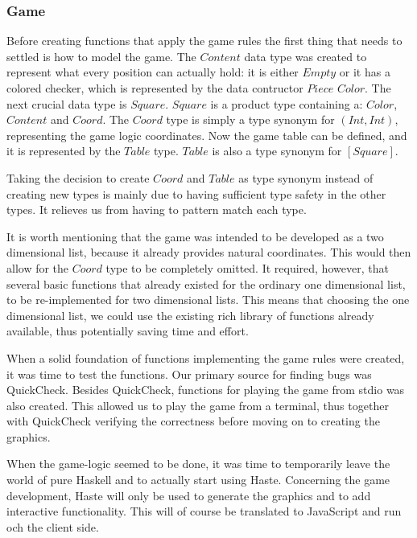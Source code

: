 \documentclass[a4paper]{article}
\begin{document}
\subsubsection{Game}
Before creating functions that apply the game rules the first thing that needs to settled is how to model the game. The $Content$ data type was created to represent what every position can actually hold: it is either $Empty$ or it has a colored checker, which is represented by the data contructor $Piece$ $Color$. The next crucial data type is $Square$. $Square$ is a product type containing a: $Color$, $Content$ and $Coord$. The $Coord$ type is simply a type synonym for $(Int,Int)$, representing the game logic coordinates. Now the game table can be defined, and it is represented by the $Table$ type. $Table$ is also a type synonym for $[Square]$.

Taking the decision to create $Coord$ and $Table$ as type synonym instead of creating new types is mainly due to having sufficient type safety in the other types. It relieves us from having to pattern match each type.

It is worth mentioning that the game was intended to be developed as a two dimensional list, because it already provides natural coordinates. This would then allow for the $Coord$ type to be completely omitted. It required, however, that several basic functions that already existed for the ordinary one dimensional list, to be re-implemented for two dimensional lists. This means that choosing the one dimensional list, we could use the existing rich library of functions already available, thus potentially saving time and effort.

When a solid foundation of functions implementing the game rules were created, it was time to test the functions. Our primary source for finding bugs was QuickCheck. Besides QuickCheck, functions for playing the game from stdio was also created. This allowed us to play the game from a terminal, thus together with QuickCheck verifying the correctness before moving on to creating the graphics.

When the game-logic seemed to be done, it was time to temporarily leave the world of pure Haskell and to actually start using Haste. Concerning the game development, Haste will only be used to generate the graphics and to add interactive functionality. This will of course be translated to JavaScript and run och the client side.
\end{document}
